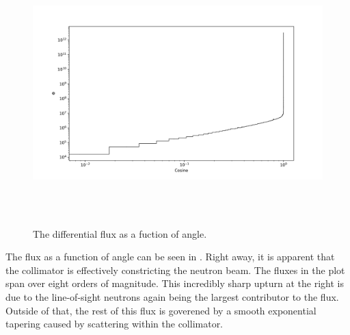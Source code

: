 \clearpage

%
\begin{figure}[htb]
\centering
\includegraphics[height=4in]{tex/figures/flux_cos.png}
\caption[Flux vs. Angle]{The differential flux as a fuction of angle.}
\label{fig:flux_cos}
\end{figure}

The flux as a function of angle can be seen in .
Right away, it is apparent that the collimator is effectively constricting the neutron beam.
The fluxes in the plot span over eight orders of magnitude.
This incredibly sharp upturn at the right is due to the line-of-sight neutrons again being the largest contributor to the flux.
Outside of that, the rest of this flux is goverened by a smooth exponential tapering caused by scattering within the collimator.

\clearpage

